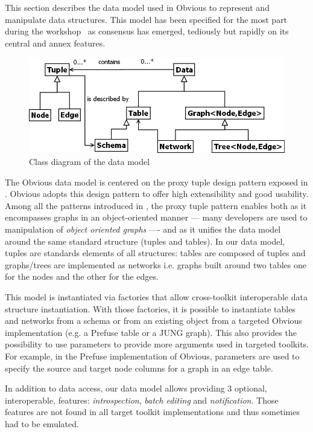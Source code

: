 This section describes the data model used in Obvious to represent and
manipulate data structures.  This model has been specified for the
most part during the workshop~\cite{vismaster2008} as consensus has
emerged, tediously but rapidly on its central and annex features.

\begin{figure}[!ht]
\includegraphics[width=\columnwidth]{figures/obviousdataclass}
\caption{Class diagram of the data model}
\label{fig:datamodel}
\end{figure}

The Obvious data model is centered on the proxy tuple design pattern
exposed in \cite{DesignPatternsIV}. Obvious adopts this design pattern
to offer high extensibility and good usability.  Among all the patterns
introduced in \cite{DesignPatternsIV}, the proxy tuple pattern enables
both as it encompasses graphs in an object-oriented manner --- many
developers are used to manipulation of \emph{object oriented graphs}
---- and as it unifies the data model around the same standard
structure (tuples and tables). In our data model, tuples are standards
elements of all structures: tables are composed of tuples and
graphs/trees are implemented as networks i.e. graphs built around two
tables one for the nodes and the other for the edges.

This model is instantiated via factories that allow cross-toolkit
interoperable data structure instantiation. With those factories, it
is possible to instantiate tables and networks from a schema or from
an existing object from a targeted Obvious implementation (e.g. a
Prefuse table or a JUNG graph). This also provides the possibility
to use parameters to provide more arguments used in targeted
toolkits. For example, in the Prefuse implementation of Obvious,
parameters are used to specify the source and target node columns for
a graph in an edge table.

In addition to data access, our data model allows providing 3
optional, interoperable, features: \emph{introspection}, \emph{batch
  editing} and \emph{notification}. Those features are not found in
all target toolkit implementations and thus sometimes had to be
emulated.
 
